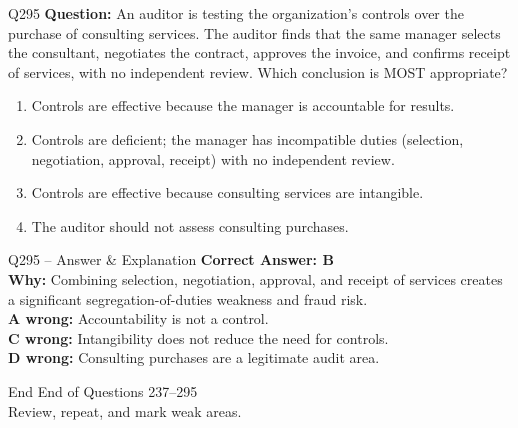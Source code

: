 \documentclass[aspectratio=169,10pt]{beamer}
\begin{document}
	\begin{frame}[t]{Q295}
		\small
		\textbf{Question:} An auditor is testing the organization's controls over the purchase of consulting services. The auditor finds that the same manager selects the consultant, negotiates the contract, approves the invoice, and confirms receipt of services, with no independent review. Which conclusion is MOST appropriate?
		\begin{enumerate}[label=\Alph*.,itemsep=1pt,topsep=2pt]
			\item Controls are effective because the manager is accountable for results.
			\item Controls are deficient; the manager has incompatible duties (selection, negotiation, approval, receipt) with no independent review.
			\item Controls are effective because consulting services are intangible.
			\item The auditor should not assess consulting purchases.
		\end{enumerate}
	\end{frame}
	
	\begin{frame}[t]{Q295 -- Answer \& Explanation}
		\small
		\textbf{Correct Answer: B} \\[4pt]
		\textbf{Why:} Combining selection, negotiation, approval, and receipt of services creates a significant segregation-of-duties weakness and fraud risk. \\[4pt]
		\textbf{A wrong:} Accountability is not a control. \\[2pt]
		\textbf{C wrong:} Intangibility does not reduce the need for controls. \\[2pt]
		\textbf{D wrong:} Consulting purchases are a legitimate audit area.
	\end{frame}
	
	\begin{frame}{End}
		\centering
		\Large End of Questions 237--295\\[8pt]
		\normalsize Review, repeat, and mark weak areas.
	\end{frame}
	
\end{document}
